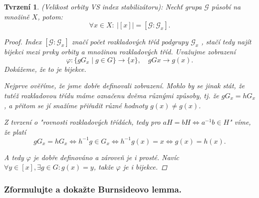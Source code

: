 \documentclass[10pt,a4paper]{article}
\newtheorem{tvrzeni}{Tvrzení}
\begin{document}
\begin{tvrzeni} (Velikost orbity VS index stabilizátoru): \normalfont
    Nechť grupa $\mathcal{G}$ působí na množině $X$, potom: $$\forall x \in X: ~|[x]|=[\mathcal{G}:\mathcal{G}_x].$$
    \begin{proof}
        Index $[\mathcal{G} : \mathcal{G}_x ]$ značí počet rozkladových tříd podgrupy $\mathcal{G}_x$ , stačí tedy najít bijekci mezi prvky orbity a množinou rozkladových tříd. 
        Uvažujme zobrazení $$\varphi: \{gG_x \mid g\in G\} \to \{x\}, \quad gGx \to g(x).$$
        Dokážeme, že to je bijekce. 
        
        Nejprve ověříme, že jsme dobře definovali zobrazení.
        Mohlo by se jinak stát, že tutéž rozkladovou třídu máme označenu dvěma různými způsoby, tj. že $gG_x = hG_x$, a přitom se jí snažíme přiřadit různé hodnoty $g(x)\neq g(x)$.

        Z tvrzení o "rovnosti rozkladových třídách, tedy pro $aH=bH\iff a^{-1}b\in H$" víme, že platí 
        $$gG_x =hG_x \iff h^{-1}g \in G_x\iff h^{-1}g(x)=x \iff g(x)=h(x).$$

        A tedy $\varphi$ je dobře definováno a zároveň je i prosté. Navíc $\forall y \in [x], \exists g\in G: g(x)=y$, takže $\varphi$ je i bijekce.
    \end{proof}
\end{tvrzeni}
\newpage

\subsubsection{Zformulujte a dokažte Burnsideovo lemma.}
\end{document}
